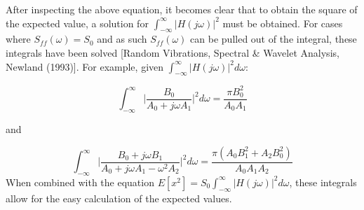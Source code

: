 \documentclass[12pt,letter]{article}
\numberwithin{ex}{section} %
\begin{document}
After inspecting the above equation, it becomes clear that to obtain the square of the expected value, a solution for  $\int_{-\infty}^{\infty} |H(j\omega)|^2$ must be obtained. For cases where $S_{ff}(\omega) = S_0$ and as such $S_{ff}(\omega)$ can be pulled out of the integral, these integrals have been solved [Random Vibrations, Spectral \& Wavelet Analysis, Newland (1993)]. For example, given $\int_{-\infty}^{\infty} |H(j\omega)|^2 d\omega$:

\begin{equation}
\int_{-\infty}^{\infty} \bigg|\frac{B_0}{A_0+j \omega A_1} \bigg|^2 d\omega = \frac{\pi B_0^2}{A_0 A_1}
\end{equation} 

and

\begin{equation}
\int_{-\infty}^{\infty} \bigg|\frac{B_0 + j \omega B_1}{A_0+j \omega A_1 - \omega^2 A_2} \bigg|^2 d\omega = \frac{\pi (A_0 B_1^2 + A_2 B_0^2)}{A_0 A_1 A_2}
\end{equation} 
When combined with the equation $E[x^2] = S_{0} \int_{-\infty}^{\infty} |H(j\omega)|^2 d\omega$, these integrals allow for the easy calculation of the expected values. 
\end{document}
